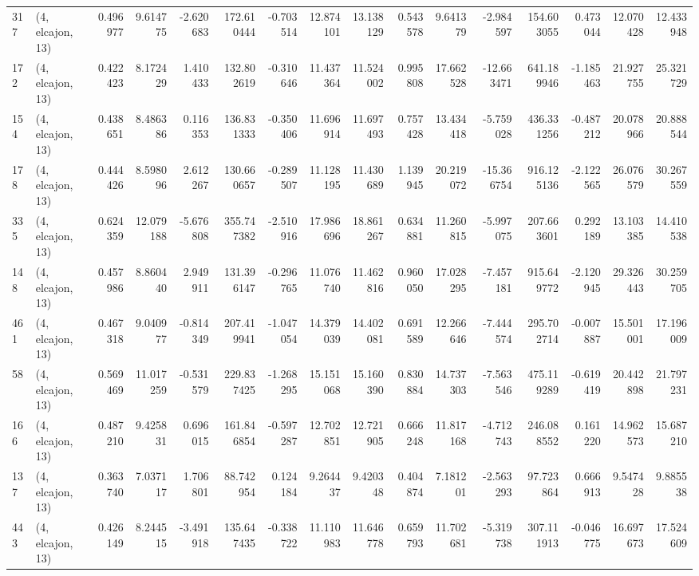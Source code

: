 \begin{tabular}{llrrrrrrrrrrrrrr}
317 &  (4, elcajon, 13) &   0.496977 &   9.614775 &  -2.620683 &   172.610444 &  -0.703514 &  12.874101 &  13.138129 &  0.543578 &   9.641379 &  -2.984597 &   154.603055 &  0.473044 &  12.070428 &  12.433948 \\
172 &  (4, elcajon, 13) &   0.422423 &   8.172429 &   1.410433 &   132.802619 &  -0.310646 &  11.437364 &  11.524002 &  0.995808 &  17.662528 & -12.663471 &   641.189946 & -1.185463 &  21.927755 &  25.321729 \\
154 &  (4, elcajon, 13) &   0.438651 &   8.486386 &   0.116353 &   136.831333 &  -0.350406 &  11.696914 &  11.697493 &  0.757428 &  13.434418 &  -5.759028 &   436.331256 & -0.487212 &  20.078966 &  20.888544 \\
178 &  (4, elcajon, 13) &   0.444426 &   8.598096 &   2.612267 &   130.660657 &  -0.289507 &  11.128195 &  11.430689 &  1.139945 &  20.219072 & -15.366754 &   916.125136 & -2.122565 &  26.076579 &  30.267559 \\
335 &  (4, elcajon, 13) &   0.624359 &  12.079188 &  -5.676808 &   355.747382 &  -2.510916 &  17.986696 &  18.861267 &  0.634881 &  11.260815 &  -5.997075 &   207.663601 &  0.292189 &  13.103385 &  14.410538 \\
148 &  (4, elcajon, 13) &   0.457986 &   8.860440 &   2.949911 &   131.396147 &  -0.296765 &  11.076740 &  11.462816 &  0.960050 &  17.028295 &  -7.457181 &   915.649772 & -2.120945 &  29.326443 &  30.259705 \\
461 &  (4, elcajon, 13) &   0.467318 &   9.040977 &  -0.814349 &   207.419941 &  -1.047054 &  14.379039 &  14.402081 &  0.691589 &  12.266646 &  -7.444574 &   295.702714 & -0.007887 &  15.501001 &  17.196009 \\
58  &  (4, elcajon, 13) &   0.569469 &  11.017259 &  -0.531579 &   229.837425 &  -1.268295 &  15.151068 &  15.160390 &  0.830884 &  14.737303 &  -7.563546 &   475.119289 & -0.619419 &  20.442898 &  21.797231 \\
166 &  (4, elcajon, 13) &   0.487210 &   9.425831 &   0.696015 &   161.846854 &  -0.597287 &  12.702851 &  12.721905 &  0.666248 &  11.817168 &  -4.712743 &   246.088552 &  0.161220 &  14.962573 &  15.687210 \\
137 &  (4, elcajon, 13) &   0.363740 &   7.037117 &   1.706801 &    88.742954 &   0.124184 &   9.264437 &   9.420348 &  0.404874 &   7.181201 &  -2.563293 &    97.723864 &  0.666913 &   9.547428 &   9.885538 \\
443 &  (4, elcajon, 13) &   0.426149 &   8.244515 &  -3.491918 &   135.647435 &  -0.338722 &  11.110983 &  11.646778 &  0.659793 &  11.702681 &  -5.319738 &   307.111913 & -0.046775 &  16.697673 &  17.524609 \\

\end{tabular}
